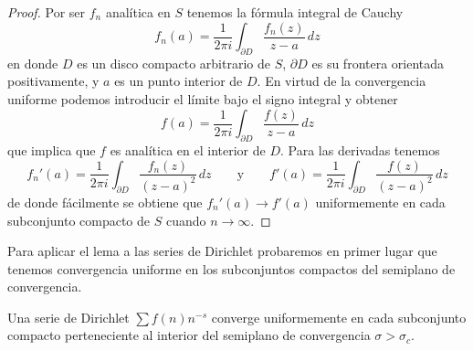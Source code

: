 \documentclass[12pt,a4paper]{book}
\begin{document}
    \begin{proof}
        Por ser $f_{n}$ analítica en $S$ tenemos la fórmula integral de Cauchy
        \begin{equation*}
            f_{n}(a)=\frac{1}{2\pi i}\int_{\partial D}\frac{f_{n}(z)}{z-a}\,dz
        \end{equation*}
        en donde $D$ es un disco compacto arbitrario de $S$, $\partial D$ es su frontera
        orientada positivamente, y $a$ es un punto interior de $D$. En virtud de la
        convergencia uniforme podemos introducir el límite bajo el signo integral y obtener
        \begin{equation*}
            f(a)=\frac{1}{2\pi i}\int_{\partial D}\frac{f(z)}{z-a}\,dz
        \end{equation*}
        que implica que $f$ es analítica en el interior de $D$. Para las derivadas tenemos
        \begin{equation*}
            f_{n}'(a)=\frac{1}{2\pi i}\int_{\partial D}\frac{f_{n}(z)}{(z-a)^{2}}\,dz\qquad\text{y}\qquad f'(a)=\frac{1}{2\pi i}\int_{\partial D}\frac{f(z)}{(z-a)^{2}}\,dz
        \end{equation*}
        de donde fácilmente se obtiene que $f_{n}'(a)\to f'(a)$ uniformemente en cada
        subconjunto compacto de $S$ cuando $n\to\infty$.
    \end{proof}

    Para aplicar el lema a las series de Dirichlet probaremos en primer lugar que tenemos
    convergencia uniforme en los subconjuntos compactos del semiplano de convergencia.

    \begin{teorema}\label{teo:11-11}
        Una serie de Dirichlet $\sum f(n)n^{-s}$ converge uniformemente en cada subconjunto
        compacto perteneciente al interior del semiplano de convergencia $\sigma>\sigma_{c}$.
    \end{teorema}
\end{document}
